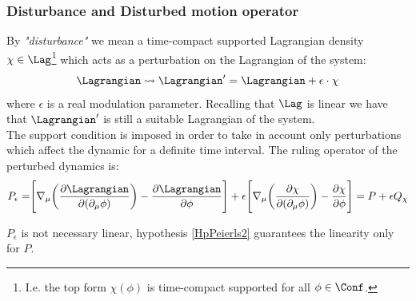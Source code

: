 \documentclass[Main]{subfiles}
\begin{document}
	\subsubsection{Disturbance and Disturbed motion operator }
		By \emph{"disturbance"} we mean a time-compact supported Lagrangian density $\chi \in \Lag$\footnote{I.e. the top form $\chi(\phi)$ is time-compact supported for all $\phi \in \Conf$.} which acts as a perturbation on the Lagrangian of the system:
		\begin{displaymath}
			\Lagrangian \rightsquigarrow \Lagrangian' = \Lagrangian + \epsilon\cdot \chi
		\end{displaymath}
		where $\epsilon$  is a real modulation parameter.
		Recalling that $\Lag$ is linear we have that $\Lagrangian'$ is still a suitable Lagrangian of the system.
		\\
		The support condition is %
		imposed in order to take in account only perturbations which affect the dynamic for a definite time interval.
		The ruling operator of the perturbed dynamics is:
		\begin{equation}
			P_\epsilon = \Biggr[ \nabla_\mu \biggr( \frac{\partial \Lagrangian}{\partial(\partial_\mu \phi)} \biggr) - \frac{\partial \Lagrangian}{\partial \phi} \Biggr] + \epsilon \Biggr[ \nabla_\mu \biggr( \frac{\partial \chi}{\partial(\partial_\mu \phi)} \biggr) - \frac{\partial \chi}{\partial \phi} \Biggr]
			= P + \epsilon Q_\chi		
		\end{equation}
		\begin{remark}
			$P_\epsilon$ is not necessary linear, hypothesis \ref{HpPeierls2} guarantees the linearity only for $P$.
		\end{remark}
\end{document}
